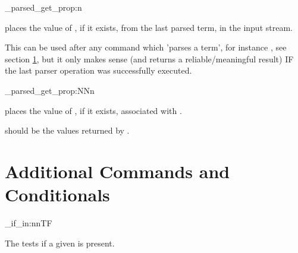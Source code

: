 \documentclass[10pt]{article}
\begin{document}
\begin{codedescribe}[code,EXP,new=2023/05/20]{\starray_parsed_get_prop:n}
\begin{codesyntax}%
\end{codesyntax}
 places the value of , if it exists, from the last parsed term, in the input stream. 
\end{codedescribe}
\begin{tsremark}
This can be used after any command which 'parses a term', for instance , see section \ref{conditionals:terms}, but it only makes sense (and returns a reliable/meaningful result) IF the last parser operation was successfully executed.
\end{tsremark}


\begin{codedescribe}[code,EXP,new=2023/11/28]{\starray_parsed_get_prop:NNn}
\begin{codesyntax}%
\end{codesyntax}
 places the value of , if it exists, associated with .
\end{codedescribe}
\begin{tsremark}
 should be the values returned by .
\end{tsremark}


\section{Additional Commands and Conditionals}\label{conditionals:terms}

\begin{codedescribe}{\starray_if_in:nnTF}
\begin{codesyntax}%
\end{codesyntax}
The  tests if a given  is present.
\end{codedescribe}
\end{document}
